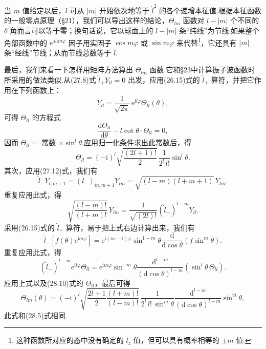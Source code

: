当 $m$ 值给定以后，$l$ 可从 $|m|$ 开始依次地等于 $\hat{l}^2$ 的各个递增本征值.根据本征函数的一般零点原理（§21），我们可以导出这样的结论，$\varTheta_{lm}$ 函数对 $l-|m|$ 个不同的 $\theta$ 角而言可以等于零；换句话说，它以球面上的 $l-|m|$ 条“纬线”为节线.如果整个角部函数中的 $\mathrm{e}^{\pm\mathrm{i}m\varphi}$ 因子用实因子 $\cos m\varphi$ 或 $\sin m\varphi$ 来代替\footnote{这种函数所对应的态中没有确定的 $l_z$ 值，但可以具有概率相等的 $\pm m$ 值.}，它还具有 $|m|$ 条“经线”节线；从而节线总数等于 $l$.

最后，我们来看一下怎样用矩阵方法算出 $\varTheta_{lm}$ 函数.它和§23中计算振子波函数时所采用的做法类似.从(27.8)式 $\hat{l}_+Y_{ll}=0$ 出发，应用(26.15)式的 $\hat{l}_+$ 算符，并把它作用在下列函数上：
\begin{equation*}
  Y_{ll}=\frac{1}{\sqrt{2\pi}}\,\mathrm{e}^{\mathrm{i}l\varphi}\varTheta_{ll}(\theta),
\end{equation*}
可得 $\varTheta_{ll}$ 的方程式
\begin{equation*}
  \frac{\mathrm{d}\varTheta_{ll}}{\mathrm{d}\theta}
  -l\cot\theta\cdot\varTheta_{ll}=0,
\end{equation*}
因而 $\varTheta_{ll}=$ 常数 $\times\sin^l\theta$.应用归一化条件求出此常数后，得
\begin{equation}
  \varTheta_{ll}=(-\mathrm{i})^l\sqrt{\frac{(2l+1)!}{2}}\,
  \frac{1}{2^l\,l!}\sin^l\theta.
\end{equation}
其次，应用(27.12)式，我们有
\begin{equation*}
  \hat{l}_-Y_{l,m+1}=(l_-)_{m,m+1}Y_{lm}
  =\sqrt{(l-m)(l+m+1)}\,Y_{lm}.
\end{equation*}
重复应用此式，得
\begin{equation*}
  \sqrt{\frac{(l-m)!}{(l+m)!}}\,Y_{lm}
  =\frac{1}{\sqrt{(2l)!}}\left(\hat{l}_-\right)^{l-m}Y_{ll}.
\end{equation*}
采用(26.15)式的 $\hat{l}_-$ 算符，易于把上式右边计算出来，我们有
\begin{equation*}
  \hat{l}_-\left[f(\theta)\mathrm{e}^{\mathrm{i}m\varphi}\right]
  =\mathrm{e}^{\mathrm{i}(m-1)\varphi}\sin^{1-m}\theta
  \frac{\mathrm{d}}{\mathrm{d}\cos\theta}\left(f\sin^m\theta\right).
\end{equation*}
重复应用此式，得
\begin{equation*}
  \left(\hat{l}_-\right)^{l-m}\mathrm{e}^{\mathrm{i}l\varphi}\varTheta_{ll}
  =\mathrm{e}^{\mathrm{i}m\varphi}\sin^{-m}\theta
  \frac{\mathrm{d}^{l-m}}{\left(\mathrm{d}\cos\theta\right)^{l-m}}
  \left(\sin^l\theta\,\varTheta_{ll}\right).
\end{equation*}
应用上式以及(28.10)式的 $\varTheta_{ll}$，最后可得
\begin{equation}
  \varTheta_{lm}(\theta)=(-\mathrm{i})^l
  \sqrt{\frac{2l+1}{2}\frac{(l+m)!}{(l-m)!}}\,
  \frac{1}{2^l\,l!\,\sin^m\theta}
  \frac{\mathrm{d}^{l-m}}{\left(\mathrm{d}\cos\theta\right)^{l-m}}
  \sin^{2l}\theta,
\end{equation}
此式和(28.5)式相同.

